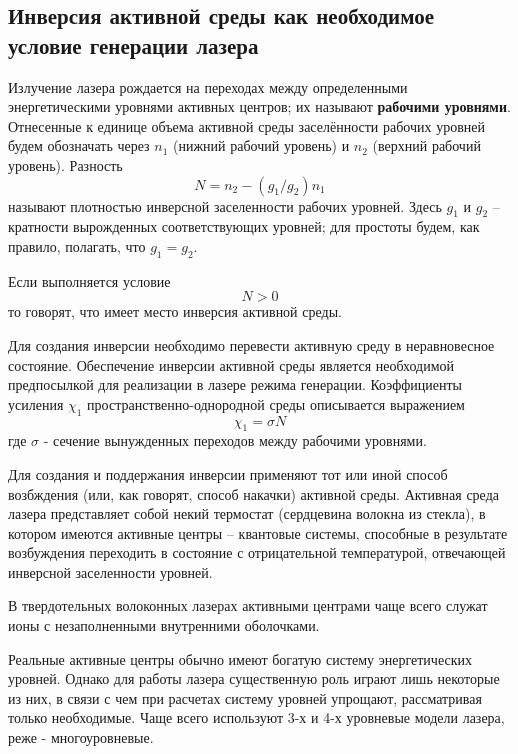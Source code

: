 \documentclass[a4paper, 12pt]{article}
\begin{document}
	\subsection{Инверсия активной среды как необходимое условие генерации лазера}
	Излучение лазера рождается на переходах между определенными энергетическими уровнями активных центров; их называют \textbf{рабочими уровнями}. Отнесенные к единице объема активной среды заселённости рабочих уровней будем обозначать через $n_1$ (нижний рабочий уровень) и $n_2$ (верхний рабочий уровень). Разность
	\begin{equation}
		N=n_2-(g_1/g_2)n_1
	\end{equation}
	называют плотностью инверсной заселенности рабочих уровней. Здесь $g_1$ и $g_2$ -- кратности вырожденных соответствующих уровней; для простоты будем, как правило, полагать, что $g_1=g_2$.\par
	Если выполняется условие
	\begin{equation}
		N>0
	\end{equation}
	то говорят, что имеет место инверсия активной среды.\par
	Для создания инверсии необходимо перевести активную среду в неравновесное состояние. Обеспечение инверсии активной среды является необходимой предпосылкой для реализации в лазере режима генерации. Коэффициенты усиления $\chi_1$ пространственно-однородной среды описывается выражением
	\begin{equation}
		\chi_1=\sigma N
	\end{equation}
	где $\sigma$ - сечение вынужденных переходов между рабочими уровнями.\par
	Для создания и поддержания инверсии применяют тот или иной способ возбждения (или, как говорят, способ накачки) активной среды. Активная среда лазера представляет собой некий термостат (сердцевина волокна из стекла), в котором имеются активные центры -- квантовые системы, способные в результате возбуждения переходить в состояние с отрицательной температурой, отвечающей инверсной заселенности уровней.\par
	В твердотельных волоконных лазерах активными центрами чаще всего служат ионы с незаполненными внутренними оболочками.\par
	Реальные активные центры обычно имеют богатую систему энергетических уровней. Однако для работы лазера существенную роль играют лишь некоторые из них, в связи с чем при расчетах систему уровней упрощают, рассматривая только необходимые. Чаще всего используют 3-х и 4-х уровневые модели лазера, реже - многоуровневые.
\end{document}

